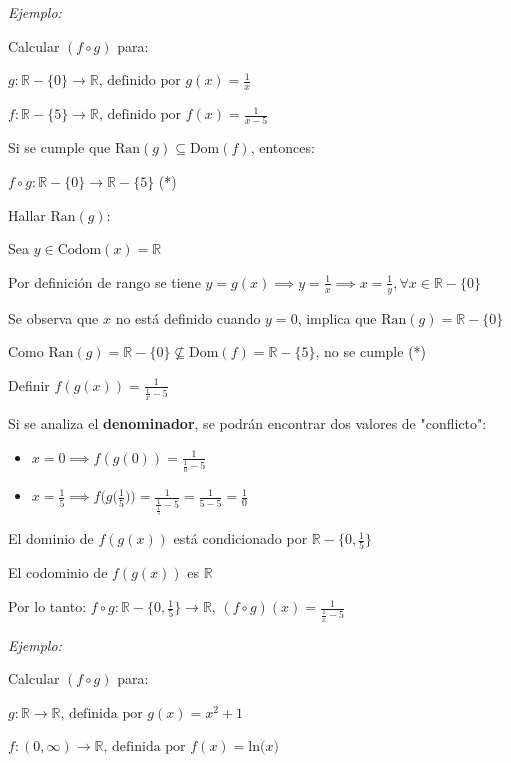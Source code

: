 \documentclass{article}
\begin{document}
\textit{Ejemplo:}

Calcular $(f \circ g)$ para: 

$\displaystyle g: \mathbb{R} - \{0\} \to \mathbb{R} \text{, definido por } g(x) = \frac{1}{x}$ 

$\displaystyle f: \mathbb{R} - \{5\} \to \mathbb{R} \text{, definido por } f(x) = \frac{1}{x-5}$

Si se cumple que $\text{Ran}(g) \subseteq \text{Dom}(f)$, entonces:

$f \circ g: \mathbb{R} - \{0\} \to \mathbb{R} - \{5\}$ (*)

Hallar $\text{Ran}(g)$: 

Sea $y \in \text{Codom}(x) = \mathbb{R}$

Por definición de rango se tiene $\displaystyle y = g(x) \implies y = \frac{1}{x} \implies x = \frac{1}{y}, \forall x \in \mathbb{R} - \{0\}$

Se observa que $x$ no está definido cuando $y = 0$, implica que $\text{Ran}(g) = \mathbb{R} - \{0\}$

Como $\text{Ran}(g) = \mathbb{R} - \{0\} \not\subseteq \text{Dom}(f) = \mathbb{R} - \{5\}$, no se cumple (*)

Definir $\displaystyle f(g(x)) = \frac{1}{\frac{1}{x} - 5}$

Si se analiza el \textbf{denominador}, se podrán encontrar dos valores de "conflicto":

\begin{itemize}
    \item $\displaystyle x = 0 \implies f(g(0)) = \frac{1}{\frac{1}{0} - 5}$
    \item $\displaystyle x = \frac{1}{5} \implies f\Big(g\Big(\frac{1}{5}\Big)\Big) = \frac{1}{\frac{1}{\frac{1}{5}} - 5} = \frac{1}{5 - 5} = \frac{1}{0}$
\end{itemize}

El dominio de $f(g(x))$ está condicionado por $\mathbb{R} - \{0, \frac{1}{5}\}$

El codominio de $f(g(x))$ es $\mathbb{R}$

Por lo tanto: $f \circ g: \mathbb{R} - \{0, \frac{1}{5}\} \to \mathbb{R}$,  $\displaystyle (f \circ g)(x) = \frac{1}{\frac{1}{x} - 5}$

\newpage
\textit{Ejemplo:}

Calcular $(f \circ g)$ para: 

$g:\mathbb{R} \to \mathbb{R} \text{, definida por } g(x) = x^2 + 1$

$f: \left(0, \infty \right) \to \mathbb{R} \text{, definida por }f(x) = \text{ln(}x)$
\end{document}
